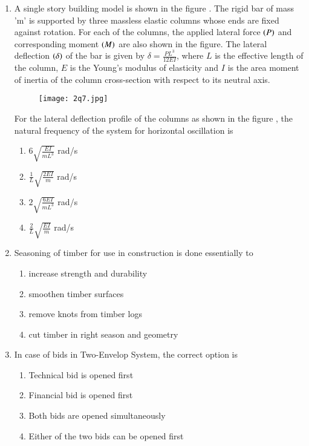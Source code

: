 \documentclass[journal,12pt,onecolumn]{article}
\theoremstyle{remark}
\begin{document}
\begin{enumerate}
\item A single story building model is shown in the figure . The rigid bar of mass 'm' is supported by three massless elastic columns whose ends are fixed against rotation. For each of the columns, the applied lateral force $\left(P\right)$ and corresponding moment $\left(M\right)$ are also shown in the figure. The lateral deflection $\left(\delta\right)$ of the bar is given by $\delta = \frac{PL^3}{12EI}$, where $L$ is the effective length of the column, $E$ is the Young's modulus of elasticity and $I$ is the area moment of inertia of the column cross-section with respect to its neutral axis.
\begin{figure}[H]
    \centering
    \texttt{[image: 2q7.jpg]}
    \caption{}
    \label{fig:q7}
\end{figure}
For the lateral deflection profile of the columns as shown in the figure , the natural frequency of the system for horizontal oscillation is

\hfill{}

\begin{enumerate}
    \item $6 \sqrt{\frac{EI}{mL^3}}$ rad/s
    \item $\frac{1}{L} \sqrt{\frac{2EI}{m}}$ rad/s
    \item $2 \sqrt{\frac{6EI}{mL^3}}$ rad/s
    \item $\frac{2}{L} \sqrt{\frac{EI}{m}}$ rad/s
\end{enumerate}

\item Seasoning of timber for use in construction is done essentially to

\hfill{}

\begin{enumerate}
    \item increase strength and durability
    \item smoothen timber surfaces
    \item remove knots from timber logs
    \item cut timber in right season and geometry
\end{enumerate}

\item In case of bids in Two-Envelop System, the correct option is

\hfill{}

\begin{enumerate}
    \item Technical bid is opened first
    \item Financial bid is opened first
    \item Both  bids are opened simultaneously
    \item Either of the two  bids can be opened first
\end{enumerate}


\end{enumerate}
\end{document}
